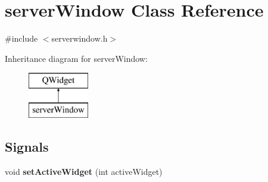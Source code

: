 \hypertarget{classserver_window}{}\section{server\+Window Class Reference}
\label{classserver_window}


{\ttfamily \#include $<$serverwindow.\+h$>$}

Inheritance diagram for server\+Window\+:\begin{figure}[H]
\begin{center}
\leavevmode
\includegraphics[height=2.000000cm]{classserver_window}
\end{center}
\end{figure}
\subsection*{Signals}
\begin{DoxyCompactItemize}
\item 
\mbox{\label{classserver_window_ac4a17bd27c09f0a64382fa130e6cccf7}} 
void {\bfseries set\+Active\+Widget} (int active\+Widget)
\end{DoxyCompactItemize}
